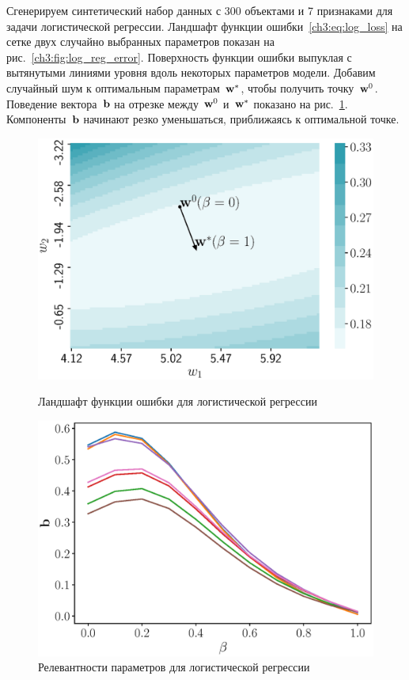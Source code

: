 Сгенерируем синтетический набор данных с 300 объектами и 7 признаками для задачи логистической регрессии. 
Ландшафт функции ошибки~\eqref{ch3:eq:log_loss} на сетке двух случайно выбранных параметров показан на рис.~\ref{ch3:fig:log_reg_error}.
Поверхность функции ошибки выпуклая с вытянутыми линиями уровня вдоль некоторых параметров модели.
Добавим случайный шум к оптимальным параметрам~$\mathbf{w}^*$, чтобы получить точку~$\mathbf{w}^0$. Поведение вектора~$\mathbf{b}$ на отрезке между~$\mathbf{w}^0$ и~$\mathbf{w}^*$ показано на рис.~\ref{ch3:fig:log_reg_b_wrt_beta}.
Компоненты~$\mathbf{b}$ начинают резко уменьшаться, приближаясь к оптимальной точке.
\begin{figure}
	\centering
	\begin{minipage}{.47\textwidth}
		\centering
		\includegraphics[width=\linewidth]{figs/ch3/log_reg_error}
		\caption{Ландшафт функции ошибки для логистической регрессии}
		\label{ch3:fig:log_reg_error}
	\end{minipage}%
	\begin{minipage}{.47\textwidth}
		\centering
		\includegraphics[width=\linewidth]{figs/ch3/log_reg_b_wrt_beta}
		\caption{Релевантности параметров для логистической регрессии}
		\label{ch3:fig:log_reg_b_wrt_beta}
	\end{minipage}
\end{figure}

